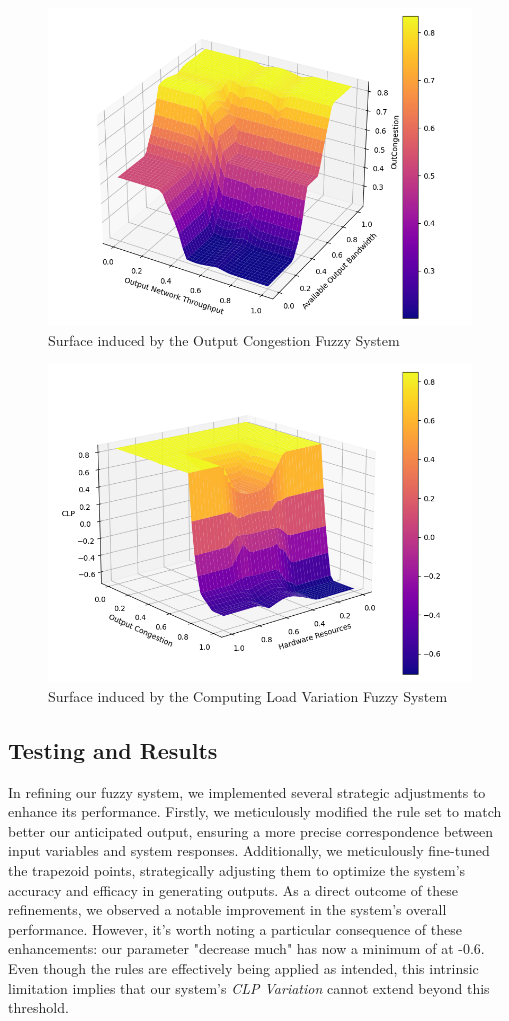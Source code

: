 \begin{figure}[!htb]
    \centering

    \includegraphics[width=.6\textwidth]{images/plots/OutCongestion3D.png}\hfill

    \caption{Surface induced by the  Output Congestion Fuzzy System}
    \label{fig:FS_OutCongestion_OUT}
\end{figure}

\begin{figure}[!htb]
    \centering

    \includegraphics[width=.6\textwidth]{images/plots/CLP3D_better.png}\hfill

    \caption{Surface induced by the Computing Load Variation Fuzzy System}
    \label{fig:FS_CLP_OUT}
\end{figure}

\newpage

\subsection{Testing and Results}

In refining our fuzzy system, we implemented several strategic adjustments to enhance its performance. Firstly, we meticulously modified the rule set to match better our anticipated output, ensuring a more precise correspondence between input variables and system responses. Additionally, we meticulously fine-tuned the trapezoid points, strategically adjusting them to optimize the system's accuracy and efficacy in generating outputs. As a direct outcome of these refinements, we observed a notable improvement in the system's overall performance. However, it's worth noting a particular consequence of these enhancements: our parameter "decrease much" has now a minimum of at -0.6. Even though the rules are effectively being applied as intended, this intrinsic limitation implies that our system's \textit{CLP Variation} cannot extend beyond this threshold.

